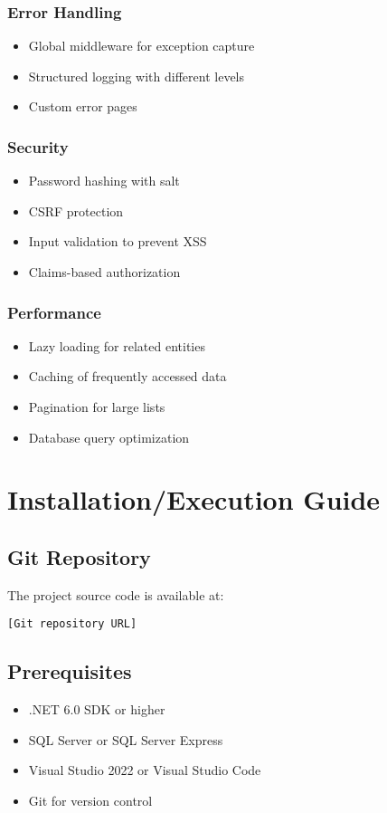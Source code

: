 \documentclass[12pt,a4paper]{article}
\begin{document}
\subsubsection{Error Handling}
\begin{itemize}
    \item Global middleware for exception capture
    \item Structured logging with different levels
    \item Custom error pages
\end{itemize}

\subsubsection{Security}
\begin{itemize}
    \item Password hashing with salt
    \item CSRF protection
    \item Input validation to prevent XSS
    \item Claims-based authorization
\end{itemize}

\subsubsection{Performance}
\begin{itemize}
    \item Lazy loading for related entities
    \item Caching of frequently accessed data
    \item Pagination for large lists
    \item Database query optimization
\end{itemize}

\section{Installation/Execution Guide}

\subsection{Git Repository}
The project source code is available at:
\begin{center}
\texttt{[Git repository URL]}
\end{center}

\subsection{Prerequisites}
\begin{itemize}
    \item .NET 6.0 SDK or higher
    \item SQL Server or SQL Server Express
    \item Visual Studio 2022 or Visual Studio Code
    \item Git for version control
\end{itemize}
\end{document}
